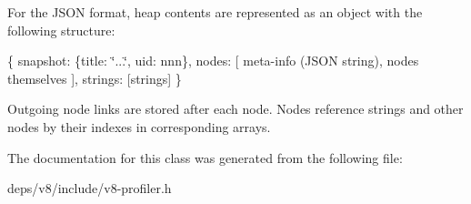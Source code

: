 For the J\+S\+O\+N format, heap contents are represented as an object with the following structure\+:

\{ snapshot\+: \{title\+: \char`\"{}...\char`\"{}, uid\+: nnn\}, nodes\+: \mbox{[} meta-\/info (J\+S\+O\+N string), nodes themselves \mbox{]}, strings\+: \mbox{[}strings\mbox{]} \}

Outgoing node links are stored after each node. Nodes reference strings and other nodes by their indexes in corresponding arrays. 

The documentation for this class was generated from the following file\+:\begin{DoxyCompactItemize}
\item 
deps/v8/include/v8-\/profiler.\+h\end{DoxyCompactItemize}
